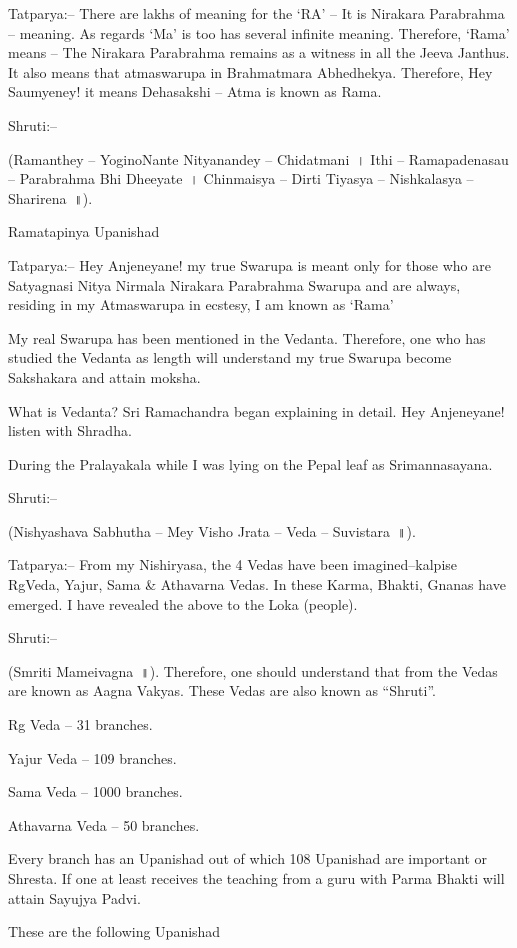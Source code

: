 Tatparya:– There are lakhs of meaning for the ‘RA’ – It is Nirakara Parabrahma – meaning. As regards ‘Ma’ is too has several infinite meaning. Therefore, ‘Rama’ means – The Nirakara Parabrahma remains as a witness in all the Jeeva Janthus. It also means that atmaswarupa in Brahmatmara Abhedhekya. Therefore, Hey Saumyeney! it means Dehasakshi – Atma is known as Rama.

Shruti:–

(Ramanthey – YoginoNante Nityanandey – Chidatmani~। Ithi – Ramapadenasau – Parabrahma Bhi Dheeyate~। Chinmaisya – Dirti Tiyasya – Nishkalasya – Sharirena~॥).

Ramatapinya Upanishad

Tatparya:– Hey Anjeneyane! my true Swarupa is meant only for those who are Satyagnasi Nitya Nirmala Nirakara Parabrahma Swarupa and are always, residing in my Atmaswarupa in ecstesy, I am known as ‘Rama’

My real Swarupa has been mentioned in the Vedanta. Therefore, one who has studied the Vedanta as length will understand my true Swarupa become Sakshakara and attain moksha.

What is Vedanta? Sri Ramachandra began explaining in detail. Hey Anjeneyane! listen with Shradha.

During the Pralayakala while I was lying on the Pepal leaf as Srimannasayana.

Shruti:–

(Nishyashava Sabhutha – Mey Visho Jrata – Veda – Suvistara~॥).

Tatparya:– From my Nishiryasa, the 4 Vedas have been imagined–kalpise RgVeda, Yajur, Sama \& Athavarna Vedas. In these Karma, Bhakti, Gnanas have emerged. I have revealed the above to the Loka (people).

Shruti:–

(Smriti Mameivagna~॥). Therefore, one should understand that from the Vedas are known as Aagna Vakyas. These Vedas are also known as “Shruti”.

Rg Veda – 31 branches.

Yajur Veda – 109 branches.

Sama Veda – 1000 branches.

Athavarna Veda – 50 branches.

Every branch has an Upanishad out of which 108 Upanishad are important or Shresta. If one at least receives the teaching from a guru with Parma Bhakti will attain Sayujya Padvi.

These are the following Upanishad

